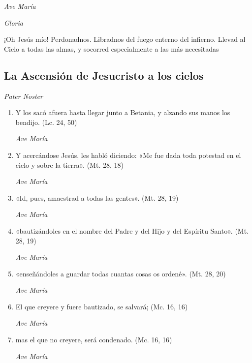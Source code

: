 \documentclass[a4paper,11pt, oneside]{report}
\begin{document}
        \textit{Ave María} \par
        \indent\textit{Gloria} \par
        \indent¡Oh Jesús mío! Perdonadnos. Libradnos del fuego enterno del infierno. Llevad al Cielo a todas las almas, y socorred especialmente a las más 
        necesitadas

      \subsection*{La Ascensión de Jesucristo a los cielos}
        
        \textit{Pater Noster}

        \begin{enumerate} 

          \item Y los sacó afuera hasta llegar junto a Betania, y alzando sus manos los bendijo. (Lc. 24, 50)

          \textit{Ave María}

          \item Y acercándose Jesús, les habló diciendo: «Me fue dada toda potestad en el cielo y sobre la tierra». (Mt. 28, 18)

          \textit{Ave María}

          \item «Id, pues, amaestrad a todas las gentes». (Mt. 28, 19)

          \textit{Ave María}

          \item «bautizándoles en el nombre del Padre y del Hijo y del Espíritu Santo». (Mt. 28, 19)

          \textit{Ave María}

          \item «enseñándoles a guardar todas cuantas cosas os ordené». (Mt. 28, 20)

          \textit{Ave María}

          \item El que creyere y fuere bautizado, se salvará; (Mc. 16, 16)

          \textit{Ave María}

          \item mas el que no creyere, será condenado. (Mc. 16, 16)

          \textit{Ave María}


\end{enumerate}
\end{document}
